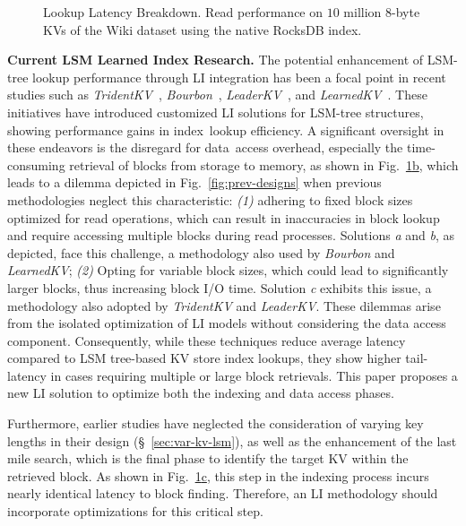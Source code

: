 \begin{figure}[t]
  \centering
  \vspace{-2em}
  \caption{\small{Lookup Latency Breakdown. Read performance on $10$ million $8$-byte KVs of the Wiki dataset using the native RocksDB index.}}
  \label{fig:rocksdb-lookup}
  \vspace{-2em}
\end{figure}
\vspace{3pt}
\noindent
\textbf{Current LSM Learned Index Research.}
The potential enhancement of LSM-tree lookup performance through LI integration has been a focal point in recent studies such as \textit{TridentKV}~\cite{TridentKV2022}, \textit{Bourbon}~\cite{Bourbon2020}, \textit{LeaderKV}~\cite{leaderkv2024}, and \textit{LearnedKV}~\cite{wang2024learnedkv}. These initiatives have introduced customized LI solutions for LSM-tree structures, showing performance gains in index~lookup efficiency. A significant oversight in these endeavors is the disregard for data~access overhead, especially the time-consuming retrieval of blocks from storage to memory, as shown in Fig.~\hyperref[fig:rocksdb-lookup]{\ref*{fig:rocksdb-lookup}b}, which leads to a dilemma depicted in Fig.~\ref{fig:prev-designs} when previous methodologies neglect this characteristic:
\textit{(1)} adhering to fixed block sizes optimized for read operations, which can result in inaccuracies in block lookup and require accessing multiple blocks during read processes. Solutions \textit{a} and \textit{b}, as depicted, face this challenge, a methodology also used by \textit{Bourbon} and \textit{LearnedKV};
\textit{(2)} Opting for variable block sizes, which could lead to significantly larger blocks, thus increasing block I/O time. Solution \textit{c} exhibits this issue, a methodology also adopted by \textit{TridentKV} and \textit{LeaderKV}. These dilemmas arise from the isolated optimization of LI models without considering the data access component. Consequently, while these techniques reduce average latency compared to LSM tree-based KV store index lookups, they show higher tail-latency in cases requiring multiple or large block retrievals. This paper proposes a new LI solution to optimize both the indexing and data access phases.

Furthermore, earlier studies have neglected the consideration of varying key lengths in their design (\S~\ref{sec:var-kv-lsm}), as well as the enhancement of the last mile search, which is the final phase to identify the target KV within the retrieved block. As shown in Fig.~\hyperref[fig:rocksdb-lookup]{\ref*{fig:rocksdb-lookup}c}, this step in the indexing process incurs nearly identical latency to block finding. Therefore, an LI methodology should incorporate optimizations for this critical step.



